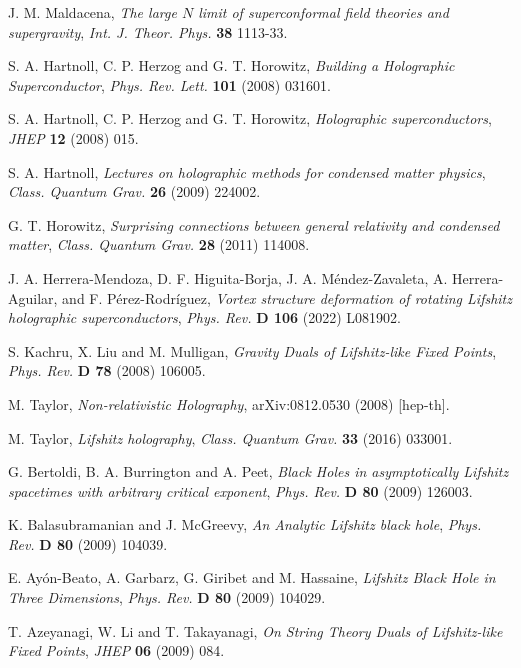 \documentclass[sn-mathphys,Numbered]{sn-jnl}%
\theoremstyle{thmstyleone}%
\theoremstyle{thmstyletwo}%
\theoremstyle{thmstylethree}%
\begin{document}
\begin{thebibliography}{99}

J. M. Maldacena, \emph{The large $N$ limit of superconformal field theories and supergravity}, \emph{Int. J. Theor. Phys.} {\bf 38} 1113-33.

S. A. Hartnoll, C. P. Herzog and G. T. Horowitz, \emph{Building a Holographic Superconductor}, \emph{Phys. Rev. Lett.} {\bf 101} (2008) 031601.

S. A. Hartnoll, C. P. Herzog and G. T. Horowitz, \emph{Holographic superconductors}, \emph{JHEP} {\bf 12} (2008) 015.

S. A. Hartnoll, \emph{Lectures on holographic methods for condensed matter physics}, \emph{Class. Quantum Grav.} {\bf 26} (2009) 224002.

G. T. Horowitz, \emph{Surprising connections between general relativity and condensed matter}, \emph{Class. Quantum Grav.} {\bf 28} (2011) 114008.

J. A. Herrera-Mendoza, D. F. Higuita-Borja, J. A. Méndez-Zavaleta, A. Herrera-Aguilar, and F. Pérez-Rodríguez, \emph{Vortex structure deformation of rotating Lifshitz holographic superconductors}, \emph{Phys. Rev.} {\bf D 106} (2022) L081902.

S. Kachru, X. Liu  and M. Mulligan, \emph{Gravity Duals of Lifshitz-like Fixed Points}, \emph{Phys. Rev.} {\bf D 78}
 (2008) 106005.

M. Taylor, \emph{Non-relativistic Holography}, arXiv:0812.0530 (2008) [hep-th].

M. Taylor, \emph{Lifshitz holography},  \emph{Class. Quantum Grav.} {\bf33} (2016) 033001.

G. Bertoldi, B. A. Burrington  and A. Peet,  \emph{Black Holes in asymptotically Lifshitz spacetimes
with arbitrary critical exponent}, \emph{Phys. Rev.} {\bf D 80} (2009) 126003.

K. Balasubramanian  and J. McGreevy, \emph{An Analytic Lifshitz black hole}, \emph{Phys. Rev.} {\bf D 80} (2009) 104039.

E. Ayón-Beato, A. Garbarz, G. Giribet and M. Hassaine, \emph{Lifshitz Black Hole in Three
Dimensions}, \emph{Phys. Rev.} {\bf D 80} (2009) 104029.

T. Azeyanagi, W. Li and T. Takayanagi, \emph{On String Theory Duals of Lifshitz-like Fixed
Points}, \emph{JHEP} {\bf 06} (2009) 084.


\end{thebibliography}
\end{document}
